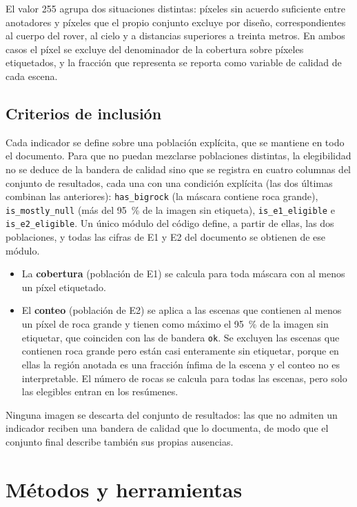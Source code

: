 El valor \num{255} agrupa dos situaciones distintas: píxeles sin acuerdo suficiente entre
anotadores y píxeles que el propio conjunto excluye por diseño, correspondientes al
cuerpo del rover, al cielo y a distancias superiores a treinta metros. En ambos casos el
píxel se excluye del denominador de la cobertura sobre píxeles etiquetados, y la fracción que
representa se reporta como variable de calidad de cada escena.

\subsection{Criterios de inclusión}

Cada indicador se define sobre una población explícita, que se mantiene en todo el documento.
Para que no puedan mezclarse poblaciones distintas, la elegibilidad no se deduce de la bandera
de calidad sino que se registra en cuatro columnas del conjunto de resultados, cada una con una
condición explícita (las dos últimas combinan las anteriores): \texttt{has\_bigrock} (la máscara contiene roca grande),
\texttt{is\_mostly\_null} (más del \SI{95}{\percent} de la imagen sin etiqueta),
\texttt{is\_e1\_eligible} e \texttt{is\_e2\_eligible}. Un único módulo del código define, a
partir de ellas, las dos poblaciones, y todas las cifras de E1 y E2 del documento se obtienen
de ese módulo.

\begin{itemize}
  \item La \textbf{cobertura} (población de E1) se calcula para toda máscara con al menos un
    píxel etiquetado.
  \item El \textbf{conteo} (población de E2) se aplica a las escenas que contienen al menos un
    píxel de roca grande y tienen como máximo el \SI{95}{\percent} de la imagen sin etiquetar, que
    coinciden con las de bandera \texttt{ok}. Se excluyen las \cNNullBig{} escenas que contienen
    roca grande pero están casi enteramente sin etiquetar, porque en ellas la región anotada es
    una fracción ínfima de la escena y el conteo no es interpretable. El número de rocas se
    calcula para todas las escenas, pero solo las elegibles entran en los resúmenes.
\end{itemize}

Ninguna imagen se descarta del conjunto de resultados: las que no admiten un indicador reciben
una bandera de calidad que lo documenta, de modo que el conjunto final describe también sus
propias ausencias.

\section{Métodos y herramientas}

